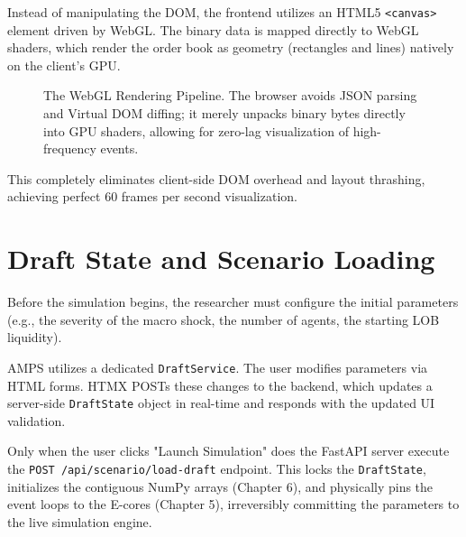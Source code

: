 Instead of manipulating the DOM, the frontend utilizes an HTML5 \texttt{<canvas>} element driven by WebGL. The binary data is mapped directly to WebGL shaders, which render the order book as geometry (rectangles and lines) natively on the client's GPU.

\begin{figure}[htbp]
\centering
{}
\caption{The WebGL Rendering Pipeline. The browser avoids JSON parsing and Virtual DOM diffing; it merely unpacks binary bytes directly into GPU shaders, allowing for zero-lag visualization of high-frequency events.}
\label{fig:webgl_pipeline}
\end{figure}

This completely eliminates client-side DOM overhead and layout thrashing, achieving perfect 60 frames per second visualization.

\section{Draft State and Scenario Loading}

Before the simulation begins, the researcher must configure the initial parameters (e.g., the severity of the macro shock, the number of agents, the starting LOB liquidity). 

AMPS utilizes a dedicated \texttt{DraftService}. The user modifies parameters via HTML forms. HTMX POSTs these changes to the backend, which updates a server-side \texttt{DraftState} object in real-time and responds with the updated UI validation. 

Only when the user clicks "Launch Simulation" does the FastAPI server execute the \texttt{POST /api/scenario/load-draft} endpoint. This locks the \texttt{DraftState}, initializes the contiguous NumPy arrays (Chapter 6), and physically pins the event loops to the E-cores (Chapter 5), irreversibly committing the parameters to the live simulation engine.
